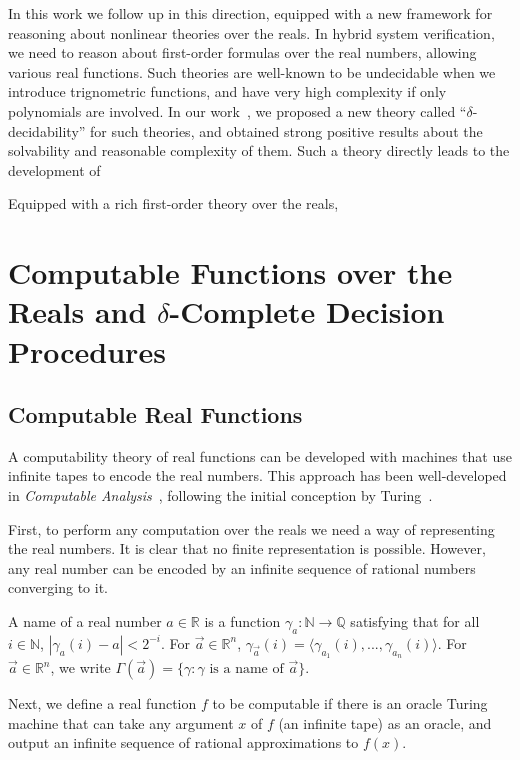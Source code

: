 \documentclass[envcountsect]{llncs}
\begin{document}
In this work we follow up in this direction, equipped with a new framework for reasoning about nonlinear theories over the reals. In hybrid system verification, we need to reason about first-order formulas over the real numbers, allowing various real functions. Such theories are well-known to be undecidable when we introduce trignometric functions, and have very high complexity if only polynomials are involved. In our work~\cite{}, we proposed a new theory called ``$\delta$-decidability'' for such theories, and obtained strong positive results about the solvability and reasonable complexity of them. Such a theory directly leads to the development of 

Equipped with a rich first-order theory over the reals, 



 


\section{Computable Functions over the Reals and $\delta$-Complete Decision Procedures}

\subsection{Computable Real Functions}

A computability theory of real functions can be developed with machines that use infinite tapes to encode the real numbers. This approach has been well-developed in {\em Computable Analysis}~\cite{CAbook,Kobook,vasco}, following the initial conception by Turing~\cite{}.

First, to perform any computation over the reals we need a way of representing the real numbers. It is clear that no finite representation is possible. However, any real number can be encoded by an infinite sequence of rational numbers converging to it. 
\begin{definition}[Names]
A name of a real number $a\in \mathbb{R}$ is a function $\mathcal{\gamma}_a: \mathbb{N}\rightarrow \mathbb{Q}$ satisfying that for all $i\in \mathbb{N}$, $|\gamma_a(i) - a|<2^{-i}.$ For $\vec a\in \mathbb{R}^n$, $\gamma_{\vec a}(i) = \langle \gamma_{a_1}(i), ..., \gamma_{a_n}(i)\rangle$. For $\vec a\in \mathbb{R}^n$, we write $\Gamma(\vec a) = \{\gamma: \gamma\mbox{ is a name of }\vec a\}$. 
\end{definition}

Next, we define a real function $f$ to be computable if there is an oracle Turing machine that can take any argument $x$ of $f$ (an infinite tape) as an oracle, and output an infinite sequence of rational approximations to $f(x)$. 
\end{document}
